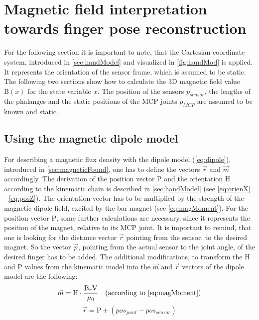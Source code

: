 \section{Magnetic field interpretation towards finger pose reconstruction} \label{sec:magmodel}

For the following section it is important to note, that the Cartesian coordinate system, introduced in \ref{sec:handModel} and visualized in \ref{fig:handMod} is applied. It represents the orientation of the sensor frame, which is assumed to be static. The following two sections show how to calculate the 3D magnetic field value $ \mathrm{B}(x) $ for the state variable $ x $. The position of the sensors $ p_{sensor} $, the lengths of the phalanges and the static positions of the \ac{MCP} joints $ p_{MCP} $ are assumed to be known and static.

\subsection{Using the magnetic dipole model} \label{subsec:implDip}

For describing a magnetic flux density with the dipole model (\ref{eq:dipole}), introduced in \ref{sec:magneticFound}, one has to define the vectors $ \vec{r} $ and $ \vec{m} $ accordingly. The derivation of the position vector $ \mathrm{P} $  and the orientation $ \mathrm{H} $ according to the kinematic chain is described in \ref{sec:handModel} (see \ref{eq:orienX} - \ref{eq:posZ}). The orientation vector has to be multiplied by the strength of the magnetic dipole field, excited by the bar magnet (see \ref{eq:magMoment}). For the position vector $ \mathrm{P} $, some further calculations are necessary, since it represents the position of the magnet, relative to its \ac{MCP} joint. It is important to remind, that one is looking for the distance vector $ \vec{r} $ pointing from the sensor, to the desired magnet. So the vector $ \vec{p} $, pointing from the actual sensor to the joint angle, of the desired finger has to be added. The additional modifications, to transform the $ \mathrm{H} $ and $ \mathrm{P} $ values from the kinematic model into the $ \vec{m} $ and $ \vec{r} $ vectors of the dipole model are the following:\\
\begin{equation}
\vec{m} = \mathrm{H} \cdot \frac{\mathrm{B}_r \mathrm{V}}{\mu_{0}} \quad \text{(according to \ref{eq:magMoment})}
\end{equation}
\begin{equation}
\vec{r} = \mathrm{P} + (pos_{joint} - pos_{sensor})
\end{equation}


